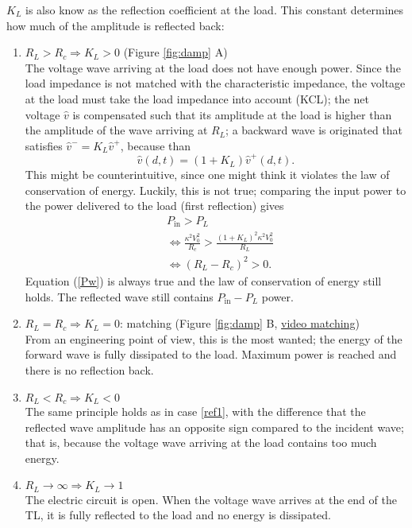$K_L$ is also know as the reflection coefficient at the load. This constant determines how much of the amplitude is reflected back:
\begin{enumerate}
\item $R_L > R_c \Rightarrow K_L > 0$ \label{ref1} (Figure \ref{fig:damp} A) \\
	The voltage wave arriving at the load does not have enough power. Since the load impedance is not matched with the characteristic impedance, the voltage at the load must take the load impedance into account (KCL); the net voltage $\hat{v}$ is compensated such that its amplitude at the load is higher than the amplitude of the wave arriving at $R_L$; a backward wave is originated that satisfies $\hat{v}^{-} = K_L\hat{v}^{+}$, because than $$\hat{v}(d, t) = (1 + K_L)\hat{v}^{+}(d, t).$$ This might be counterintuitive, since one might think it violates the law of conservation of energy. Luckily, this is not true; comparing the input power to the power delivered to the load (first reflection) gives
	\begin{align}
		&P_{\text{in}} > P_L \\
		&\Leftrightarrow \frac{\kappa^2 V^2_0}{R_c} > \frac{(1 + K_L)^2\kappa^2V^2_0}{R_L} \\
		&\Leftrightarrow (R_L-R_c)^2 > 0 \label{Pw}.
	\end{align}
Equation (\ref{Pw}) is always true and the law of conservation of energy still holds. The reflected wave still contains $P_{\text{in}} - P_L$ power.
\item $R_L = R_c \Rightarrow K_L = 0$: matching (Figure \ref{fig:damp} B,  \href{https://ugentbe-my.sharepoint.com/:f:/g/personal/constantijn_coppers_ugent_be/Evlx5Q0EKRhCggn-R1x3NKQBhiF82wRowFP4pT1nCn1ymg?e=Xi2V3R}{video matching})\\
	From an engineering point of view, this is the most wanted; the energy of the forward wave is fully dissipated to the load. Maximum power is reached and there is no reflection back.
	
\item $R_L < R_c \Rightarrow K_L <0$ \\
	The same principle holds as in case \ref{ref1}, with the difference that the reflected wave amplitude has an opposite sign compared to the incident wave; that is, because the voltage wave arriving at the load contains too much energy.

\item $R_L \longrightarrow \infty \Rightarrow K_L \longrightarrow 1$ \\
	The electric circuit is open. When the voltage wave arrives at the end of the TL, it is fully reflected to the load and no energy is dissipated.
	
\end{enumerate}
